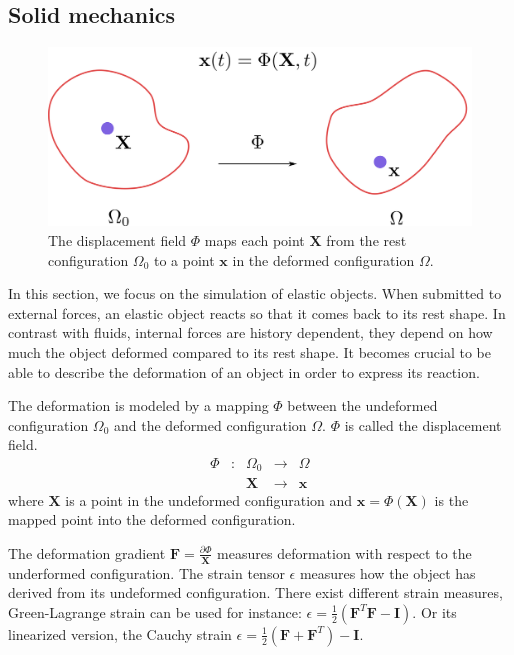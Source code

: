 \subsection{Solid mechanics}

\begin{figure}[!ht]
\centering
\includegraphics[scale=0.4]{./images/continuum_mechanics/displacementField.png}
\caption[STAR mechanics: Displacement field]{\label{fig:displacementField}
 The displacement field $\Phi$ maps each point $\mathbf{X}$ from the rest configuration $\Omega_{0}$ to a point $\mathbf{x}$ in the deformed configuration $\Omega$.}
\end{figure}

In this section, we focus on the simulation of elastic objects. When submitted to external forces, an elastic object reacts so that it comes back to its rest shape. In contrast with fluids, internal forces are history dependent, they depend on how much the object deformed compared to its rest shape. It becomes crucial to be able to describe the deformation of an object in order to express its reaction. 

The deformation is modeled by a mapping $\Phi$ between the undeformed configuration $\Omega_{0}$ and the deformed configuration $\Omega$. $\Phi$ is called the displacement field.
\begin{equation}
\begin{array}{lllll}
\Phi & : & \Omega_{0} & \longrightarrow & \Omega \\
	 &  & \mathbf{X} & \longrightarrow & \mathbf{x}
\end{array}
\end{equation}
where $\mathbf{X}$ is a point in the undeformed configuration and $\mathbf{x}=\Phi(\mathbf{X})$ is the mapped point into the deformed configuration.

The deformation gradient $\displaystyle \mathbf{F} = \frac{\partial \Phi}{\mathbf{X}}$ measures deformation with respect to the underformed configuration. The strain tensor $\epsilon$ measures how the object has derived from its undeformed configuration. There exist different strain measures, Green-Lagrange strain can be used for instance: $\displaystyle \epsilon = \frac{1}{2}\left(\mathbf{F}^{T}\mathbf{F} - \mathbf{I}\right)$. Or its linearized version, the Cauchy strain $\displaystyle \epsilon = \frac{1}{2}\left( \mathbf{F} + \mathbf{F}^{T} \right)-\mathbf{I}$.

